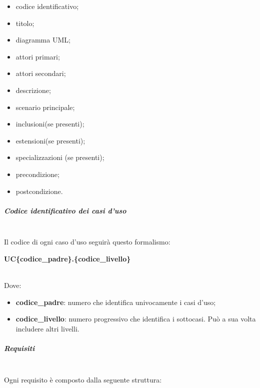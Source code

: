			\begin{itemize}
				\item codice identificativo;
				\item titolo;
				\item diagramma UML;
				\item attori primari;
				\item attori secondari;
				\item descrizione;
				\item scenario principale;
				\item inclusioni(se presenti);
				\item estensioni(se presenti);
				\item specializzazioni (se presenti);
				\item precondizione;
				\item postcondizione.
			\end{itemize}
			\subparagraph{Codice identificativo dei casi d'uso} \mbox{}\\
			Il codice di ogni caso d'uso seguirà questo formalismo: \\
			\centerline{\textbf{UC\{codice\_padre\}.\{codice\_livello\}}} \\
			Dove:
			\begin{itemize}
				\item \textbf{codice\_padre}: numero che identifica univocamente i casi d'uso;
				\item \textbf{codice\_livello}: numero progressivo che identifica i sottocasi. Può a sua volta includere altri livelli.
			\end{itemize}
			\subparagraph{Requisiti} \mbox{}\\
			Ogni requisito è composto dalla seguente struttura:
